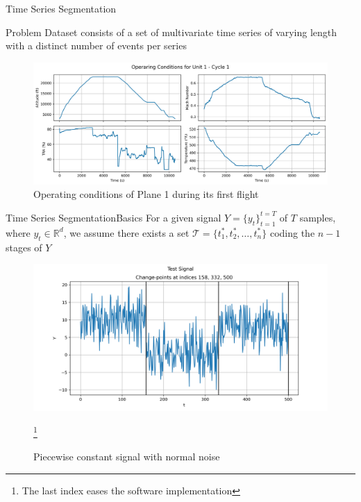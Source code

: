 \documentclass{beamer}
\begin{document}
            \begin{frame}{Time Series Segmentation}

                \begin{alertblock}{Problem}
                    Dataset consists of a set of multivariate time series of varying length with a distinct number of events per series
                \end{alertblock}
                \begin{figure}[!htbp]
                    \centering
                    \includegraphics[scale=0.3]{operating_conditions_unit_1_cycle_1.png}
                    \caption{Operating conditions of Plane 1 during its first flight}
                \end{figure}

            \end{frame}

            \begin{frame}{Time Series Segmentation}{Basics}
                For a given signal $Y = \{y_t\}_{t=1}^{t=T}$ of $T$ samples, where $y_t \in \mathbb{R}^d$, we assume there exists a set $\mathcal{T} = \{t_{1}^{*}, t_{2}^{*}, \dots, t_{n}^{*}\}$ coding the $n-1$ stages of $Y$

                \begin{figure}[!htbp]
                    \centering
                    \includegraphics[scale=0.35]{show_series.png}
                    \caption{Piecewise constant signal with normal noise}
                    \footnote{The last index eases the software implementation}
                \end{figure}
            \end{frame}
\end{document}
